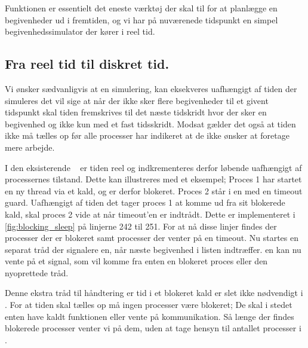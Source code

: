 Funktionen  er essentielt det eneste værktøj der skal til for at planlægge en begivenheder ud i fremtiden, og vi har på nuværenede tidspunkt en  simpel begivenhedssimulator der kører i reel tid. 

\subsection{Fra reel tid til diskret tid.}\label{sec:}
Vi ønsker sædvanligvis at en simulering, kan eksekveres uafhængigt af tiden der simuleres det vil sige at når der ikke sker flere begivenheder til et givent tidspunkt skal tiden fremskrives til det næste tidskridt hvor der sker en begivenhed og ikke kun med et fast tidsskridt. Modsat gælder det også at tiden ikke må tælles op før alle processer har indikeret at de ikke ønsker at foretage mere arbejde. 

I den eksisterende \sched ~ er tiden reel og indkrementeres derfor løbende uafhængigt af processernes tilstand. Dette kan illustreres med et eksempel; Proces 1 har startet en ny thread via et  kald, og er derfor blokeret. Proces 2 står i en  med en timeout guard. Uafhængigt af tiden det tager proces 1 at komme ud fra sit blokerede kald, skal proces 2 vide at når timeout'en er indtrådt. Dette er implementeret i \cref{fig:blocking_sleep} på linjerne 242 til 251. For at nå disse linjer findes der processer der er blokeret samt processer der venter på en timeout. Nu startes en separat tråd der signalere \sched en, når næste begivenhed i  listen indtræffer. \Sched en kan nu vente på et signal, som vil komme fra enten en blokeret proces eller den nyoprettede tråd.

Denne ekstra tråd til håndtering er tid i et blokeret kald er slet ikke nødvendigt i \des. For at tiden skal tælles op må ingen processer være blokeret; De skal i stedet enten have kaldt funktionen  eller vente på kommunikation.  
Så længe der findes blokerede processer venter vi på dem, uden at tage hensyn til antallet processer i .

